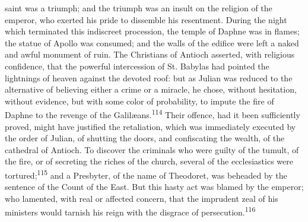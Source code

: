 saint was a triumph; and the triumph was an insult on the
religion of the emperor, who exerted his pride to dissemble his
resentment. During the night which terminated this indiscreet
procession, the temple of Daphne was in flames; the statue of
Apollo was consumed; and the walls of the edifice were left a
naked and awful monument of ruin. The Christians of Antioch
asserted, with religious confidence, that the powerful
intercession of St. Babylas had pointed the lightnings of heaven
against the devoted roof: but as Julian was reduced to the
alternative of believing either a crime or a miracle, he chose,
without hesitation, without evidence, but with some color of
probability, to impute the fire of Daphne to the revenge of the
Galilæans.\textsuperscript{114} Their offence, had it been sufficiently proved,
might have justified the retaliation, which was immediately
executed by the order of Julian, of shutting the doors, and
confiscating the wealth, of the cathedral of Antioch. To discover
the criminals who were guilty of the tumult, of the fire, or of
secreting the riches of the church, several of the ecclesiastics
were tortured;\textsuperscript{115} and a Presbyter, of the name of Theodoret, was
beheaded by the sentence of the Count of the East. But this hasty
act was blamed by the emperor; who lamented, with real or
affected concern, that the imprudent zeal of his ministers would
tarnish his reign with the disgrace of persecution.\textsuperscript{116}





